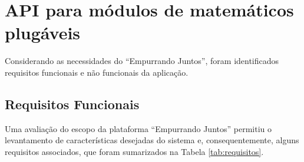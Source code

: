 \chapter{API para módulos de matemáticos plugáveis} \label{cap:proposta}

Considerando as necessidades do ``Empurrando Juntos'', foram identificados requisitos funcionais e não funcionais 
da aplicação.

\section*{Requisitos Funcionais}

Uma avaliação do escopo da plataforma ``Empurrando Juntos'' permitiu o levantamento de características desejadas do sistema e,
consequentemente, alguns requisitos associados, que foram sumarizados na Tabela \ref{tab:requisitos}.


